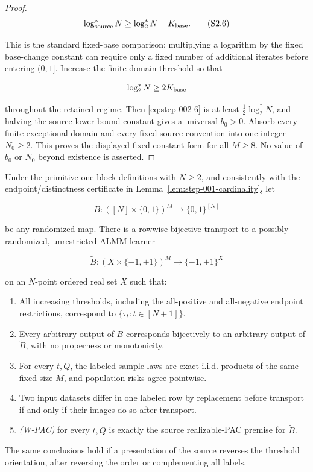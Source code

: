 \begin{proof}
\[
\log^*_{\rm source}N
\ge \log_2^*N-K_{\rm base}.
\tag{S2.6}\label{eq:step-002-6}
\]

This is the standard fixed-base comparison: multiplying a logarithm by the fixed base-change constant can require only a fixed number of additional iterates before entering \((0,1]\). Increase the finite domain threshold so that

\[
\log_2^*N\ge2K_{\rm base}
\]

throughout the retained regime. Then \eqref{eq:step-002-6} is at least \(\frac12\log_2^*N\), and halving the source lower-bound constant gives a universal \(b_0>0\). Absorb every finite exceptional domain and every fixed source convention into one integer \(N_0\ge2\). This proves the displayed fixed-constant form for all \(M\ge8\). No value of \(b_0\) or \(N_0\) beyond existence is asserted. \end{proof}

\begin{lemma}\label{lem:step-002-transport}
Under the primitive one-block definitions with \(N\ge2\), and consistently with the endpoint/distinctness certificate in Lemma~\ref{lem:step-001-cardinality}, let

\[
B:([N]\times\{0,1\})^M\longrightarrow\{0,1\}^{[N]}
\]

be any randomized map. There is a rowwise bijective transport to a possibly randomized, unrestricted ALMM learner

\[
\widetilde B:(X\times\{-1,+1\})^M
\longrightarrow\{-1,+1\}^{X}
\]

on an \(N\)-point ordered real set \(X\) such that:

\begin{enumerate}
\item All increasing thresholds, including the all-positive and all-negative
endpoint restrictions, correspond to \(\{\tau_t:t\in[N+1]\}\).
\item Every arbitrary output of \(B\) corresponds bijectively to an
arbitrary output of \(\widetilde B\), with no properness or monotonicity.
\item For every \(t,Q\), the labeled sample laws are exact i.i.d. products
of the same fixed size \(M\), and population risks agree pointwise.
\item Two input datasets differ in one labeled row by replacement before
transport if and only if their images do so after transport.
\item \emph{(W-PAC)} for every \(t,Q\) is exactly the source realizable-PAC
premise for \(\widetilde B\).
\end{enumerate}

The same conclusions hold if a presentation of the source reverses the threshold orientation, after reversing the order or complementing all labels.
\end{lemma}


